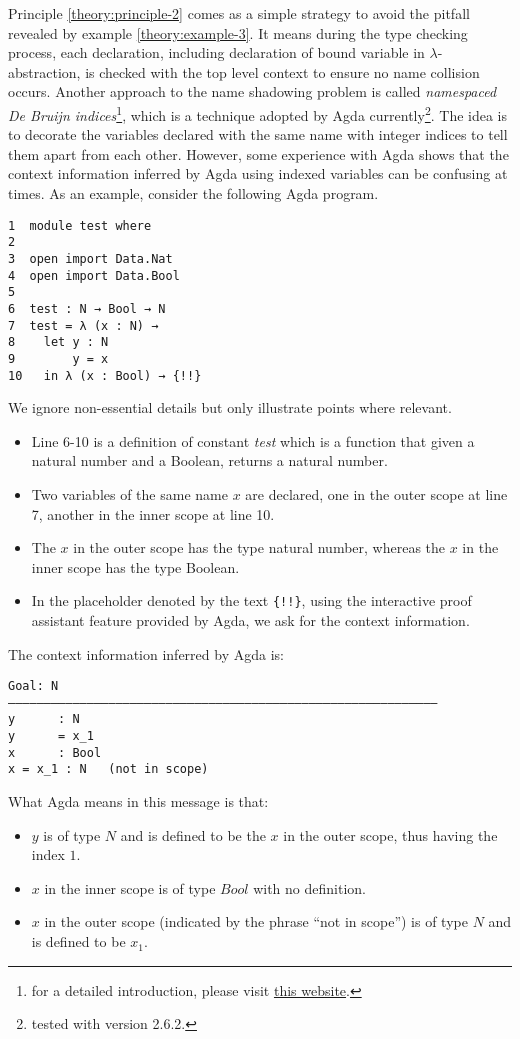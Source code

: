 Principle \ref{theory:principle-2} comes as a simple strategy to avoid the pitfall revealed by example \ref{theory:example-3}. It means during the type checking process, each declaration, including declaration of bound variable in $\lambda$-abstraction, is checked with the top level context to ensure no name collision occurs. Another approach to the name shadowing problem is called \emph{namespaced De Bruijn indices}\footnote{for a detailed introduction, please visit  \href{https://www.haskellforall.com/2021/08/namespaced-de-bruijn-indices.HTML}{this website}.}, which is a technique adopted by Agda currently\footnote{tested with version 2.6.2.}. The idea is to decorate the variables declared with the same name with integer indices to tell them apart from each other. However, some experience with Agda shows that the context information inferred by Agda using indexed variables can be confusing at times. As an example, consider the following Agda program.
\begin{Verbatim}[fontsize=\small]
1  module test where
2
3  open import Data.Nat
4  open import Data.Bool
5
6  test : N → Bool → N 
7  test = λ (x : N) →
8    let y : N 
9        y = x
10   in λ (x : Bool) → {!!}
\end{Verbatim}
We ignore non-essential details but only illustrate points where relevant.
\begin{itemize}
\item Line 6-10 is a definition of constant \emph{test} which is a function that given a natural number and a Boolean, returns a natural number.
\item Two variables of the same name $x$ are declared, one in the outer scope at line 7, another in the inner scope at line 10.
\item The $x$ in the outer scope has the type natural number, whereas the $x$ in the inner scope has the type Boolean.
\item In the placeholder denoted by the text \texttt{\{!!\}}, using the interactive proof assistant feature provided by Agda, we ask for the context information.
\end{itemize}
The context information inferred by Agda is:
\begin{Verbatim}[fontsize=\small]
Goal: N
————————————————————————————————————————————————————————————
y      : N 
y      = x_1
x      : Bool
x = x_1 : N   (not in scope)
\end{Verbatim}
What Agda means in this message is that:
\begin{itemize}
\item $y$ is of type $N$ and is defined to be the $x$ in the outer scope, thus having the index $1$.
\item $x$ in the inner scope is of type $Bool$ with no definition.
\item $x$ in the outer scope (indicated by the phrase ``not in scope'') is of type $N$ and is defined to be $x_1$.
\end{itemize}
